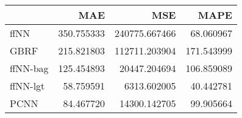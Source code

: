 \begin{tabular}{lrrr}
\toprule
{} &         MAE &            MSE &        MAPE \\
\midrule
ffNN     &  350.755333 &  240775.667466 &   68.060967 \\
GBRF     &  215.821803 &  112711.203904 &  171.543999 \\
ffNN-bag &  125.454893 &   20447.204694 &  106.859089 \\
ffNN-lgt &   58.759591 &    6313.602005 &   40.442781 \\
PCNN     &   84.467720 &   14300.142705 &   99.905664 \\
\bottomrule
\end{tabular}
